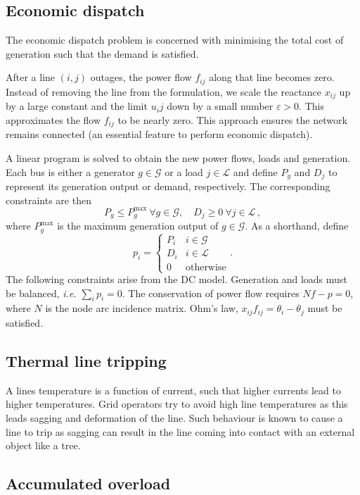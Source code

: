 \documentclass{article}
\newcommand{\ie}{\textit{i.e. }}
\newcommand{\e}{\varepsilon}
\newcommand{\mc}{\mathcal}
\renewcommand{\t}{\text}
\begin{document}
\subsection{Economic dispatch}

The economic dispatch problem is concerned with minimising the total cost of generation such that the demand is satisfied.  

After a line $(i,j)$ outages, the power flow $f_{ij}$ along that line becomes zero. Instead of removing the line from the formulation, we scale the reactance $x_{ij}$ up by a large constant and the limit $u_ij$ down by a small number $\e>0$. This approximates the flow $f_{ij}$ to be nearly zero. This approach ensures the network remains connected (an essential feature to perform economic dispatch). 

A linear program is solved to obtain the new power flows, loads and generation. Each bus is either a generator $g\in \mc G$ or a load $j\in \mc L$ and define $P_g$ and $D_j$ to represent its generation output or demand, respectively. The corresponding constraints are then
\[P_g \le P_g^{\t{max}} \ \forall g\in \mc G, \quad D_j \ge 0 \ \forall j\in \mc L\,,\]
 where $P_g^{\t{max}}$ is the maximum generation output of $g\in \mc G$. As a shorthand, define 
 \[p_i = \begin{cases}P_i & i\in \mc G\\ D_i & i\in \mc L\\ 0 & \t{otherwise} \end{cases}.\]
 The following constraints arise from the DC model. Generation and loads must be balanced, \ie $\sum_i p_i =0$. The conservation of power flow requires $Nf-p=0$, where $N$ is the node arc incidence matrix. Ohm's law, $x_{ij}f_{ij} = \theta_i-\theta_j$ must be satisfied. 

\subsection{Thermal line tripping}

A lines temperature is a function of current, such that higher currents lead to higher temperatures. Grid operators try to avoid high line temperatures as this leads sagging and deformation of the line. Such behaviour is known to cause a line to trip as sagging can result in the line coming into contact with an external object like a tree. 

\subsection{Accumulated overload}
\end{document}
